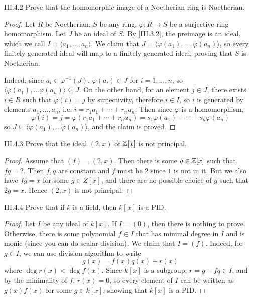 \begin{problem}{III.4.2}
Prove that the homomorphic image of a Noetherian ring is Noetherian.
\end{problem}
\begin{proof}
Let $R$ be Noetherian, $S$ be any ring, $\varphi:R \to S$ be a surjective ring homomorphism. Let $J$ be an ideal of $S$. By \ref{III.3.2}, the preimage is an ideal, which we call $I = \langle a_1, \dotsc,  a_n \rangle$. We claim that $J = \langle \varphi(a_1), \dotsc, \varphi(a_n) \rangle$, so every finitely generated ideal will map to a finitely generated ideal, proving that $S$ is Noetherian.

Indeed, since $a_i \in \varphi^{-1}(J)$, $\varphi(a_i) \in J$ for $i = 1,\dotsc,n$, so $\langle \varphi(a_1), \dotsc \varphi(a_n) \rangle \subseteq J$. On the other hand, for an element $j \in J$, there exists $i \in R$ such that $\varphi(i) = j$ by surjectivity, therefore $i \in I$, so $i$ is generated by elements $a_1, \dotsc ,a_n$, i.e. $i = r_1a_1 + \cdots + r_na_n$. Then since $\varphi$ is a homomorphism,
\[
\varphi(i) = j = \varphi(r_1a_1 + \cdots + r_na_n) = s_1\varphi(a_1) + \cdots + s_n\varphi(a_n)
\]
so $J \subseteq \langle \varphi(a_1), \dotsc \varphi(a_n) \rangle$, and the claim is proved.
\end{proof}

\begin{problem}{III.4.3}
Prove that the ideal $(2,x)$ of $\mathbb{Z}[x]$ is not principal.
\end{problem}
\begin{proof}
Assume that $(f) = (2,x)$. Then there is some $q \in \mathbb{Z}[x]$ such that $fq = 2$. Then $f,q$ are constant and $f$ must be $2$ since $1$ is not in it. But we also have $fg = x$ for some $g \in Z[x]$, and there are no possible choice of $g$ such that $2g = x$. Hence $(2,x)$ is not principal.
\end{proof}

\begin{problem}{III.4.4}
Prove that if $k$ is a field, then $k[x]$ is a PID.
\end{problem}
\begin{proof}
Let $I$ be any ideal of $k[x]$. If $I = (0)$, then there is nothing to prove. Otherwise, there is some polynomial $f\in I$ that has minimal degree in $I$ and is monic (since you can do scalar division). We claim that $I = (f)$. Indeed, for $g \in I$, we can use division algorithm to write
\[
g(x) = f(x)q(x) + r(x)
\]
where $\deg r(x) < \deg f(x)$. Since $k[x]$ is a subgroup, $r = g - fq \in I$, and by the minimality of $f$, $r(x) = 0$, so every element of $I$ can be written as $g(x)f(x)$ for some $g \in k[x]$, showing that $k[x]$ is a PID.
\end{proof}

